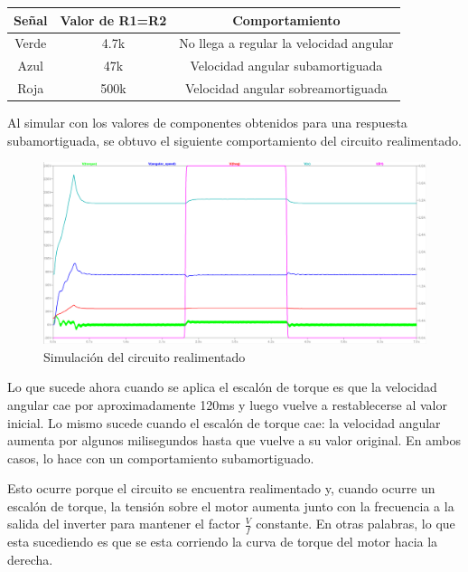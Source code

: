 \documentclass[e4_tp3_main.tex]{subfiles}
\begin{document}
\begin{table}[H]
\centering
\begin{tabular}{|c|l|l|l|c|c|}
\hline
\multicolumn{4}{|c|}{Señal} & Valor de R1=R2 & Comportamiento                          \\ \hline
\multicolumn{4}{|c|}{Verde} & 4.7k           & No llega a regular la velocidad angular \\ \hline
\multicolumn{4}{|c|}{Azul}  & 47k            & Velocidad angular subamortiguada      \\ \hline
\multicolumn{4}{|c|}{Roja}  & 500k           & Velocidad angular sobreamortiguada        \\ \hline
\end{tabular}
\end{table}


\vspace{0.5cm}
Al simular con los valores de componentes obtenidos para una respuesta subamortiguada, se obtuvo el siguiente comportamiento del circuito realimentado. 

\begin{figure}[H]
	\centering
	\includegraphics[width=0.8\linewidth]{Imagenes/3-2-subamortiguado.png}
	\caption{Simulación del circuito realimentado}
	\label{fig:comportamiento}
\end{figure}


Lo que sucede ahora cuando se aplica el escal\'on de torque es que la velocidad angular cae por aproximadamente 120ms y luego vuelve a restablecerse al valor inicial. Lo mismo sucede cuando el escal\'on de torque cae: la velocidad angular aumenta por algunos milisegundos hasta que vuelve a su valor original. En ambos casos, lo hace con un comportamiento subamortiguado.  
\vspace{0.5cm}

Esto ocurre porque el circuito se encuentra realimentado y, cuando ocurre un escal\'on de torque, la tensi\'on sobre el motor aumenta junto con la frecuencia a la salida del inverter para mantener el factor $\frac{V}{f}$ constante. En otras palabras, lo que esta sucediendo es que se esta corriendo la curva de torque del motor hacia la derecha. 
\end{document}

